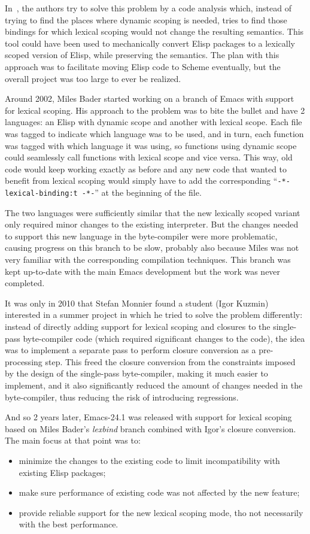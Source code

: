 \documentclass[format=acmsmall, review=false, screen=true]{acmart}
\newcommand \Elisp {Elisp}
\begin{document}
In~\cite{Neubauer01}, the authors try to solve this problem by a code
analysis which, instead of trying to find the places where dynamic scoping is
needed, tries to find those bindings for which lexical scoping would not
change the resulting semantics.  This tool could have been used to
mechanically convert \Elisp{} packages to a lexically scoped version of
\Elisp{}, while preserving the semantics.  The plan with this approach
was to facilitate moving \Elisp{} code to Scheme eventually, but the
overall project was too large to ever be realized.

Around 2002, Miles Bader started working on a branch of Emacs with support
for lexical scoping.  His approach to the problem was to bite the bullet and
have 2 languages: an \Elisp{} with dynamic scope and another with lexical
scope.  Each file was tagged to indicate which language was to be used, and
in turn, each function was tagged with which language it was using, so
functions using dynamic scope could seamlessly call functions with lexical
scope and vice versa.  This way, old code would keep working exactly as
before and any new code that wanted to benefit from lexical scoping would
simply have to add the corresponding ``\texttt{-*- lexical-binding:t -*-}''
at the beginning of the file.

The two languages were sufficiently similar that the new lexically scoped
variant only required minor changes to the existing interpreter.  But the
changes needed to support this new language in the byte-compiler were more
problematic, causing progress on this branch to be slow, probably also
because Miles was not very familiar with the corresponding
compilation techniques.  This branch was kept up-to-date with the main Emacs
development but the work was never completed.

It was only in 2010 that Stefan Monnier found a student (Igor Kuzmin)
interested in a summer project in which he tried to solve the problem
differently: instead of directly adding support for lexical scoping and
closures to the single-pass byte-compiler code (which required significant
changes to the code), the idea was to implement a separate pass to perform
closure conversion as a pre-processing step.  This freed the closure
conversion from the constraints imposed by the design of the single-pass
byte-compiler, making it much easier to implement, and it also significantly
reduced the amount of changes needed in the byte-compiler, thus reducing the
risk of introducing regressions.

And so 2 years later, Emacs-24.1 was released with support for lexical
scoping based on Miles Bader's \emph{lexbind} branch combined with Igor's
closure conversion.  The main focus at that point was to:
\begin{itemize}
\item minimize the changes to the existing code to limit incompatibility
  with existing \Elisp{} packages;
\item make sure performance of existing code was not affected by the
  new feature;
\item provide reliable support for the new lexical scoping mode, tho not
  necessarily with the best performance.
\end{itemize}
\end{document}

